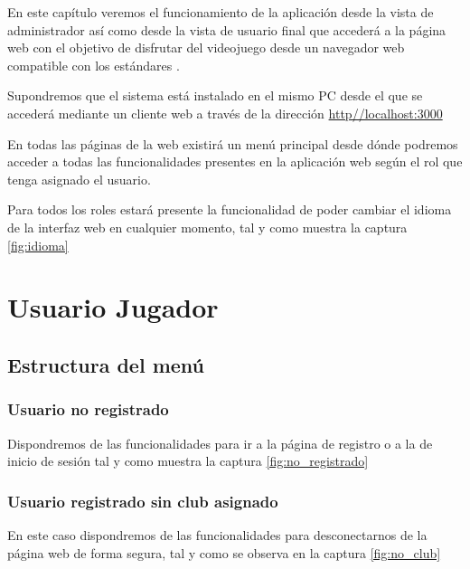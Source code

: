 

En este capítulo veremos el funcionamiento de la aplicación desde la vista de
administrador así como desde la vista de usuario final que accederá a la página
web con el objetivo de disfrutar del videojuego desde un navegador web
compatible con los estándares .

Supondremos que el sistema está instalado en el mismo PC desde el que se
accederá mediante un cliente web a través de la dirección
\url{http//localhost:3000}

En todas las páginas de la web existirá un menú principal desde dónde podremos
acceder a todas las funcionalidades presentes en la aplicación web según el rol
que tenga asignado el usuario.

Para todos los roles estará presente la funcionalidad de poder cambiar el idioma
de la interfaz web en cualquier momento, tal y como muestra la captura
\ref{fig:idioma}


\section{Usuario Jugador}

\subsection{Estructura del menú}

\subsubsection{Usuario no registrado}
Dispondremos de las funcionalidades para ir a la página de registro o a la de
inicio de sesión tal y como muestra la captura \ref{fig:no_registrado}

\subsubsection{Usuario registrado sin club asignado}
En este caso dispondremos de las funcionalidades para desconectarnos de la
página web de forma segura, tal y como se observa en la captura
\ref{fig:no_club}

